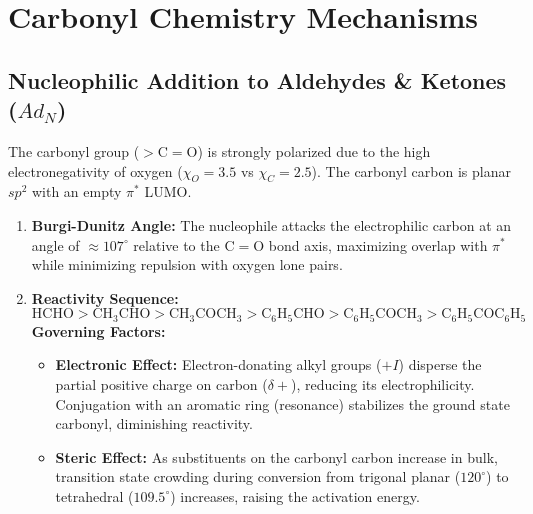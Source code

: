 \documentclass[10pt,a4paper]{article}
\begin{document}
\newpage
\section{Carbonyl Chemistry Mechanisms}

\subsection{Nucleophilic Addition to Aldehydes \& Ketones (\texorpdfstring{$Ad_N$}{AdN})}

\begin{conceptbox}
The carbonyl group ($>\mathrm{C=O}$) is strongly polarized due to the high electronegativity of oxygen ($\chi_O = 3.5$ vs $\chi_C = 2.5$). The carbonyl carbon is planar $sp^2$ with an empty $\pi^*$ LUMO.
\begin{enumerate}[leftmargin=*]
  \item \textbf{Burgi-Dunitz Angle:} The nucleophile attacks the electrophilic carbon at an angle of $\approx 107^\circ$ relative to the $\mathrm{C=O}$ bond axis, maximizing overlap with $\pi^*$ while minimizing repulsion with oxygen lone pairs.
  \item \textbf{Reactivity Sequence:}
  \begin{equation}
    \mathrm{HCHO} > \mathrm{CH_3CHO} > \mathrm{CH_3COCH_3} > \mathrm{C_6H_5CHO} > \mathrm{C_6H_5COCH_3} > \mathrm{C_6H_5COC_6H_5}
  \end{equation}
  \textbf{Governing Factors:}
  \begin{itemize}
    \item \textbf{Electronic Effect:} Electron-donating alkyl groups ($+I$) disperse the partial positive charge on carbon ($\delta+$), reducing its electrophilicity. Conjugation with an aromatic ring (resonance) stabilizes the ground state carbonyl, diminishing reactivity.
    \item \textbf{Steric Effect:} As substituents on the carbonyl carbon increase in bulk, transition state crowding during conversion from trigonal planar ($120^\circ$) to tetrahedral ($109.5^\circ$) increases, raising the activation energy.
  \end{itemize}
\end{enumerate}
\end{conceptbox}
\end{document}
